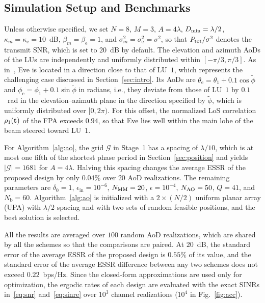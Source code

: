 \documentclass[journal]{IEEEtran}
\newcommand{\rev}[1]{{\color{red}#1}}
\newcommand{\rev}[1]{#1}
\begin{document}
\subsection{Simulation Setup and Benchmarks}\label{sec:sim_setup}

Unless otherwise specified, we set $N=8$, $M=3$, $A=4\lambda$, $D_{\min}=\lambda/2$, $\kappa_m=\kappa_{\mathrm e}=10$~dB, $\beta_m=\beta_{\mathrm e}=1$, and $\sigma_m^2=\sigma_{\mathrm e}^2=\sigma^2$, so that $P_{\mathrm{tot}}/\sigma^2$ denotes the transmit SNR, which is set to $20$~dB by default. The elevation and azimuth AoDs of the LUs are independently and uniformly distributed within $[-\pi/3,\pi/3]$. As in~\cite{ChenArxiv2026}, Eve is located in a direction close to that of LU~$1$, which represents the challenging case discussed in Section~\ref{sec:intro}. Its AoDs are \rev{$\theta_{\mathrm e}=\theta_1+0.1\cos\tilde\phi$ and $\phi_{\mathrm e}=\phi_1+0.1\sin\tilde\phi$ in radians, i.e., they deviate from those of LU~$1$ by $0.1$~rad in the elevation--azimuth plane in the direction specified by $\tilde\phi$,} which is uniformly distributed over $[0,2\pi)$. \rev{For this offset,} the normalized LoS correlation $\rho_1(\mathbf{t})$ \rev{of the FPA exceeds $0.94$, so that} Eve lies well within the main lobe of the beam steered toward LU~$1$.

For Algorithm~\ref{alg:ao}, the grid $\mathcal G$ in Stage~1 has a spacing of $\lambda/10$, which is at most one fifth of the shortest phase period in Section~\ref{sec:position} and yields $|\mathcal G|=1681$ for $A=4\lambda$. Halving this spacing changes the average ESSR of the proposed design by only \rev{$0.04\%$} over $20$ AoD realizations. The remaining parameters are $\delta_0=1$, $\epsilon_{\mathrm{in}}=10^{-6}$, $N_{\mathrm{MM}}=20$, $\epsilon=10^{-4}$, $N_{\mathrm{AO}}=50$, $Q=41$, and $N_{\mathrm b}=60$. Algorithm~\ref{alg:ao} is initialized with a $2\times(N/2)$ uniform planar array (UPA) with $\lambda/2$ spacing and with two sets of random feasible positions, and the best solution is selected.

All the results are averaged over $100$ random AoD realizations, which are shared by all the schemes so that the comparisons are paired. At $20$~dB, the standard error of the average ESSR of the proposed design is \rev{$0.55\%$} of its value, and the standard error of the average ESSR difference between any two schemes does not exceed \rev{$0.22$}~bps/Hz. Since the closed-form approximations are used only for optimization, the ergodic rates of each design are evaluated with the exact SINRs in~\eqref{eq:snr} and~\eqref{eq:sinre} over \rev{$10^3$} channel realizations ($10^4$ in Fig.~\ref{fig:acc}).
\end{document}
